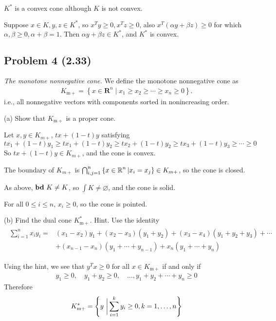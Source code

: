 \documentclass[en,hazy,blue,10pt,device = normal]{elegantnote}
\begin{document}
\begin{center}
    \(K^*\) is a convex cone although \(K\) is not convex.
\end{center}
\begin{tcolorbox}
    \pf

    Suppose \(x \in K,y,z \in K^*\), so \(x^Ty\geq 0 , x^T z \geq 0\), also \(x^T(\alpha y + \beta z) \geq 0\) for which \(\alpha, \beta \geq 0, \alpha + \beta = 1\). Then \(\alpha y + \beta z \in K^*\), and \(K^*\) is convex.
\end{tcolorbox}

\subsection*{Problem 4 (2.33)}
\textit{The monotone nonnegative cone.} We define the monotone nonnegative cone as
\begin{align*}
K_{\mathrm{m}+}=\left\{x \in \mathbf{R}^n \mid x_1 \geq x_2 \geq \cdots \geq x_n \geq 0\right\} .
\end{align*}
i.e., all nonnegative vectors with components sorted in nonincreasing order.

(a) Show that \(K_{\mathrm{m+}}\) is a proper cone.
\begin{tcolorbox}
    \sol

    Let \(x,y \in K_{m+}\), \(tx + (1-t )y\) satisfying
    \[tx_1 + (1-t)y_1 \geq tx_1 + (1-t)y_2 \geq tx_2 + (1-t)y_2 \geq tx_3 + (1-t)y_3 \geq \cdots \geq 0\]
    So \(tx + (1-t)y \in K_{m+}\), and the cone is convex.

    The boundary of \(K_{m+}\) is \(\bigcap _{i,j = 1}^n \left\{x \in \operatorname{\mathbb R}^n | x_i = x_j \right\} \in K_{m+}\), so the cone is closed.

    As above, \({\textbf{bd}\ } K \neq K\), so \(\int K \neq \varnothing\), and the cone is solid.

    For all \(0\leq i\leq n\), \(x_i \geq 0\), so the cone is pointed.
\end{tcolorbox}
(b) Find the dual cone \(K_{\mathrm{m}+}^*\). Hint. Use the identity
\begin{align*}
\begin{aligned}
\sum_{i=1}^n x_i y_i= & \left(x_1-x_2\right) y_1+\left(x_2-x_3\right)\left(y_1+y_2\right)+\left(x_3-x_4\right)\left(y_1+y_2+y_3\right)+\cdots \\
& +\left(x_{n-1}-x_n\right)\left(y_1+\cdots+y_{n-1}\right)+x_n\left(y_1+\cdots+y_n\right)
\end{aligned}
\end{align*}
\begin{tcolorbox}
    \sol

    Using the hint, we see that \(y^T x \geq 0\) for all \(x \in K_{\mathrm{m}+}\) if and only if
    \begin{align*}
    y_1 \geq 0, \quad y_1+y_2 \geq 0, \quad \ldots, y_1+y_2+\cdots+y_n \geq 0
    \end{align*}
    Therefore
    \begin{align*}
    K_{\mathrm{m}+}^*=\left\{y\ \bigg{|} \sum_{i=1}^k y_i \geq 0, k=1, \ldots, n\right\}
    \end{align*}
\end{tcolorbox}
\end{document}
